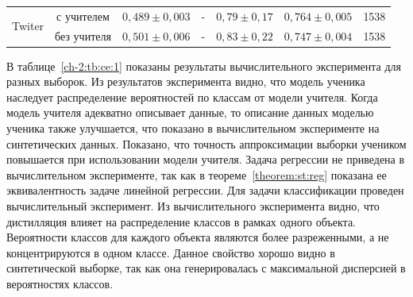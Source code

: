 \begin{table}[]
\begin{center}
{\begin{tabular}{|l|c|c|c|c|c|c|}
\multirow{2}{*}{Twiter}       & с учителем  & $0{,}489\pm0{,}003$                                               & -                                                                                             & $0{,}79\pm0{,}17$                                               & $0{,}764\pm0{,}005$ & 1538                                                       \\ \cline{2-7} 
                              & без учителя &  $0{,}501\pm0{,}006$                                                & -                                                                                             & $0{,}83\pm0{,}22$                                               & $0{,}747\pm0{,}004$ & 1538                                                       \\ \hline 
\end{tabular}
}
\end{center}
\end{table}

В таблице~\ref{ch-2:tb:ce:1} 
показаны результаты вычислительного эксперимента для разных выборок. Из результатов эксперимента видно, что модель ученика наследует распределение вероятностей по классам от модели учителя. Когда модель учителя адекватно описывает данные, то описание данных моделью ученика также улучшается, что показано в вычислительном эксперименте на синтетических данных. Показано, что точность аппроксимации выборки учеником повышается при использовании модели учителя. Задача регрессии не приведена в вычислительном эксперименте, так как в теореме~\ref{theorem:st:reg} показана ее эквивалентность задаче линейной регрессии. Для задачи классификации проведен вычислительный эксперимент. Из вычислительного эксперимента видно, что дистилляция влияет на распределение классов в рамках одного объекта. Вероятности классов для каждого объекта являются более разреженными, а не концентрируются в одном классе. Данное свойство хорошо видно в синтетической выборке, так как она генерировалась с максимальной дисперсией в вероятностях классов.